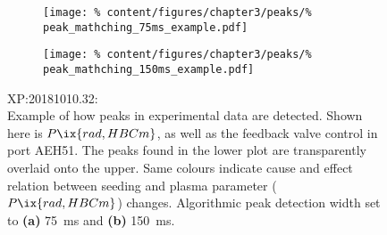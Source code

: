 %
        \begin{figure}[t]%
            \centering%
            \begin{subfigure}{0.49\textwidth}%
                \texttt{[image: \%
                    content/figures/chapter3/peaks/\%
                    peak\_mathching\_75ms\_example.pdf]}%
                \caption{}%
            \end{subfigure}%
            \begin{subfigure}{0.49\textwidth}%
                \texttt{[image: \%
                    content/figures/chapter3/peaks/\%
                    peak\_mathching\_150ms\_example.pdf]}%
                \caption{}%
            \end{subfigure}%
            \caption{%
                XP:20181010.32:\\%
                Example of how peaks in experimental data are detected. Shown here is $P\ix{rad,HBCm}$, as well as the feedback valve control in port AEH51. The peaks found in the lower plot are transparently overlaid onto the upper. Same colours indicate cause and effect relation between seeding and plasma parameter ($P\ix{rad,HBCm}$) changes.  Algorithmic peak detection width set to \textbf{(a)} \SI{75}{\milli\second} and \textbf{(b)} \SI{150}{\milli\second}.}\label{fig:peak_finding_examples}%
        \end{figure}%
%

